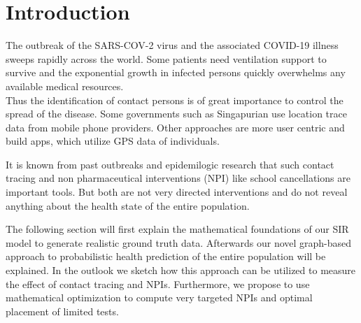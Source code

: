 
\section{Introduction}
The outbreak of the SARS-COV-2 virus and the associated COVID-19 illness sweeps rapidly across the world.
Some patients need ventilation support to survive and the exponential growth in infected persons quickly overwhelms any available medical resources.\\
Thus the identification of contact persons is of great importance to control the spread of the disease.
Some governments such as Singapurian use location trace data from mobile phone providers.
Other approaches are more user centric and build apps, which utilize GPS data of individuals.

It is known from past outbreaks and epidemilogic research that such contact tracing and non pharmaceutical interventions (NPI) like school cancellations are important tools. 
But both are not very directed interventions and do not reveal anything about the health state of the entire population.

The following section will first explain the mathematical foundations of our SIR model to generate realistic ground truth data.
Afterwards our novel graph-based approach to probabilistic health prediction of the entire population will be explained.
In the outlook we sketch how this approach can be utilized to measure the effect of contact tracing and NPIs.
Furthermore, we propose to use mathematical optimization to compute very targeted NPIs and optimal placement of limited tests.